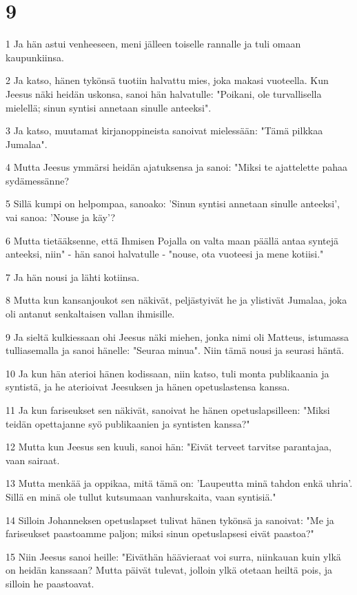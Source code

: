 \chapter{9}

\par 1 Ja hän astui venheeseen, meni jälleen toiselle rannalle ja tuli omaan kaupunkiinsa.
\par 2 Ja katso, hänen tykönsä tuotiin halvattu mies, joka makasi vuoteella. Kun Jeesus näki heidän uskonsa, sanoi hän halvatulle: "Poikani, ole turvallisella mielellä; sinun syntisi annetaan sinulle anteeksi".
\par 3 Ja katso, muutamat kirjanoppineista sanoivat mielessään: "Tämä pilkkaa Jumalaa".
\par 4 Mutta Jeesus ymmärsi heidän ajatuksensa ja sanoi: "Miksi te ajattelette pahaa sydämessänne?
\par 5 Sillä kumpi on helpompaa, sanoako: 'Sinun syntisi annetaan sinulle anteeksi', vai sanoa: 'Nouse ja käy'?
\par 6 Mutta tietääksenne, että Ihmisen Pojalla on valta maan päällä antaa syntejä anteeksi, niin" - hän sanoi halvatulle - "nouse, ota vuoteesi ja mene kotiisi."
\par 7 Ja hän nousi ja lähti kotiinsa.
\par 8 Mutta kun kansanjoukot sen näkivät, peljästyivät he ja ylistivät Jumalaa, joka oli antanut senkaltaisen vallan ihmisille.
\par 9 Ja sieltä kulkiessaan ohi Jeesus näki miehen, jonka nimi oli Matteus, istumassa tulliasemalla ja sanoi hänelle: "Seuraa minua". Niin tämä nousi ja seurasi häntä.
\par 10 Ja kun hän aterioi hänen kodissaan, niin katso, tuli monta publikaania ja syntistä, ja he aterioivat Jeesuksen ja hänen opetuslastensa kanssa.
\par 11 Ja kun fariseukset sen näkivät, sanoivat he hänen opetuslapsilleen: "Miksi teidän opettajanne syö publikaanien ja syntisten kanssa?"
\par 12 Mutta kun Jeesus sen kuuli, sanoi hän: "Eivät terveet tarvitse parantajaa, vaan sairaat.
\par 13 Mutta menkää ja oppikaa, mitä tämä on: 'Laupeutta minä tahdon enkä uhria'. Sillä en minä ole tullut kutsumaan vanhurskaita, vaan syntisiä."
\par 14 Silloin Johanneksen opetuslapset tulivat hänen tykönsä ja sanoivat: "Me ja fariseukset paastoamme paljon; miksi sinun opetuslapsesi eivät paastoa?"
\par 15 Niin Jeesus sanoi heille: "Eiväthän häävieraat voi surra, niinkauan kuin ylkä on heidän kanssaan? Mutta päivät tulevat, jolloin ylkä otetaan heiltä pois, ja silloin he paastoavat.
